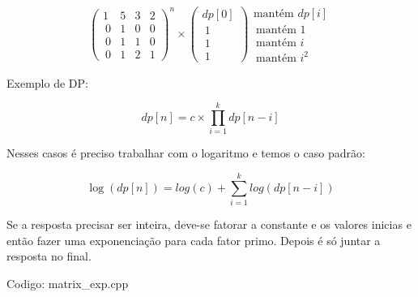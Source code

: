 \documentclass[10pt, a4paper, oneside]{book}
\begin{document}
$$ \begin{pmatrix} 1&5&3&2 \\\ 0&1&0&0 \\\ 0&1&1&0 \\\ 0&1&2&1 \end{pmatrix}^n \times \begin{pmatrix} dp[0]   \\\ 1       \\\ 1       \\\ 1\end {pmatrix} \begin{matrix} \text{mantém } dp[i]   \\\ \text{mantém }1       \\\ \text{mantém }i       \\\ \text{mantém }i^2      \end {matrix} $$



\textbf{} 


Exemplo de DP:



$$ dp[n] =  c\times \prod_{i=1}^{k} dp[n-i] $$



Nesses casos é preciso trabalhar com o logaritmo e temos o caso padrão:





$$ \log(dp[n]) =  log(c) + \sum_{i=1}^{k} log(dp[n-i]) $$



Se a resposta precisar ser inteira, deve-se fatorar a constante e os valores inicias e então fazer uma exponenciação para cada fator primo. Depois é só juntar a resposta no final.

\hfill

Codigo: matrix\_exp.cpp
\end{document}
